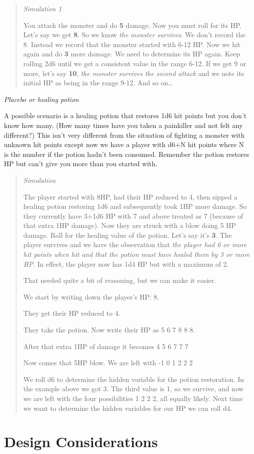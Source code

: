 \documentclass[12pt]{article}
\begin{document}
\begin{quote}
\emph{Simulation 1}

You attack the monster and do \textbf{5} damage. Now you must roll for
its HP. Let's say we get \textbf{8}. So we know \emph{the monster
survives}. We don't record the 8. Instead we record that the monster
started with 6-12 HP. Now we hit again and do \textbf{3} more damage. We
need to determine its HP again. Keep rolling 2d6 until we get a
consistent value in the range 6-12. If we get 9 or more, let's say
\textbf{10}, \emph{the monster survives the second attack} and we note
its initial HP as being in the range 9-12. And so on\ldots{}
\end{quote}

\emph{Placebo or healing potion}

A possible scenario is a healing potion that restores 1d6 hit points but
you don't know how many. (How many times have you taken a painkiller and
not felt any different?) This isn't very different from the situation of
fighting a monster with unknown hit points except now we have a player
with d6+N hit points where N is the number if the potion hadn't been
consumed. Remember the potion restores HP but can't give you more than
you started with.

\begin{quote}
\emph{Simulation}

The player started with 8HP, had their HP reduced to 4, then sipped a
healing potion restoring 1d6 and subsequently took 1HP more damage. So
they currently have 3+1d6 HP with 7 and above treated as 7 (because of
that extra 1HP damage). Now they are struck with a blow doing 5 HP
damage. Roll for the healing value of the potion. Let's say it's
\textbf{3}. The player survives and we have the observation that
\emph{the player had 6 or more hit points when hit and that the potion
must have healed them by 3 or more HP}. In effect, the player now has
1d4 HP but with a maximum of 2.

That needed quite a bit of reasoning, but we can make it easier.

We start by writing down the player's HP: 8.

They get their HP reduced to 4.

They take the potion. Now write their HP as 5 6 7 8 8 8.

After that extra 1HP of damage it becomes 4 5 6 7 7 7

Now comes that 5HP blow. We are left with -1 0 1 2 2 2

We roll d6 to determine the hidden variable for the potion restoration.
In the example above we got 3. The third value is 1, so we survive, and
now we are left with the four possibilities 1 2 2 2, all equally likely.
Next time we want to determine the hidden variables for our HP we can
roll d4.
\end{quote}
\fi
\hypertarget{design-considerations}{%
\section{Design Considerations}\label{design-considerations}}
\end{document}

